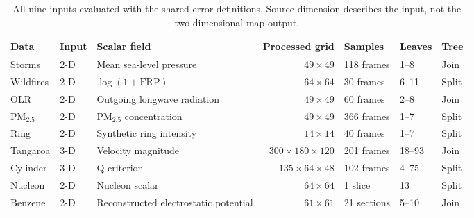 \begin{table}[t]
\caption{All nine inputs evaluated with the shared error definitions. Source dimension describes the input, not the two-dimensional map output.}\label{tab:datasets_main}
\centering\footnotesize\setlength{\tabcolsep}{4pt}
\begin{tabular}{lllrlll}\toprule
Data & Input & Scalar field & Processed grid & Samples & Leaves & Tree\\\midrule
Storms & 2-D & Mean sea-level pressure & $49\times49$ & 118 frames & 1--8 & Join\\
Wildfires & 2-D & $\log(1+\mathrm{FRP})$ & $64\times64$ & 30 frames & 6--11 & Split\\
OLR & 2-D & Outgoing longwave radiation & $49\times49$ & 60 frames & 2--8 & Join\\
PM$_{2.5}$ & 2-D & PM$_{2.5}$ concentration & $49\times49$ & 366 frames & 1--7 & Split\\
Ring & 2-D & Synthetic ring intensity & $14\times14$ & 40 frames & 1--7 & Split\\
Tangaroa & 3-D & Velocity magnitude & $300\times180\times120$ & 201 frames & 18--93 & Join\\
Cylinder & 3-D & Q criterion & $135\times64\times48$ & 102 frames & 4--75 & Split\\
Nucleon & 2-D & Nucleon scalar & $64\times64$ & 1 slice & 13 & Split\\
Benzene & 2-D & Reconstructed electrostatic potential & $61\times61$ & 21 sections & 5--10 & Join\\
\bottomrule\end{tabular}
\par{}
\end{table}
